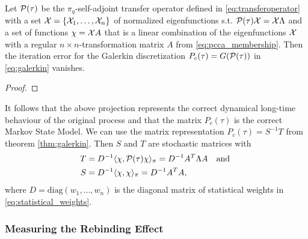 \begin{thm}
Let $\mathcal{P}(\tau)$ be the $\pi_q$-self-adjoint transfer operator defined in \eqref{eq:transferoperator} with a set $\mathcal{X} = \{ \mathcal{X}_1,\dots, \mathcal{X}_n\}$ of normalized eigenfunctions s.t. $\mathcal{P} (\tau) \mathcal{X} = \mathcal{X} \Lambda$ and a set of functions $\chi = \mathcal{X} A$ that is a linear combination of the eigenfunctions $\mathcal{X}$ with a regular $n \times n$-transformation matrix $A$ from \eqref{eq:pcca_membership}.
Then the iteration error for the Galerkin discretization $P_c(\tau) = G(\mathcal{P}(\tau))$ in \eqref{eq:galerkin} vanishes.
\end{thm}
\begin{proof}
\end{proof}
It follows that the above projection represents the correct dynamical long-time behaviour of the original process and that the matrix $P_c(\tau)$ is the correct Markov State Model.
We can use the matrix representation $P_c(\tau)=S^{-1}T$ from theorem \ref{thm:galerkin}. Then $S$ and $T$ are stochastic matrices with 
\begin{equation}
\label{eq:projection_presentation}
\begin{aligned}
T & = D^{-1} \langle \chi, \mathcal{P}(\tau) \chi \rangle_\pi = D^{-1}A^T \Lambda A \ \ \textrm{ and } \\
S & = D^{-1} \langle \chi, \chi \rangle_\pi = D^{-1} A^T A,
\end{aligned}
\end{equation}
where $D= \mathrm{diag}(w_1,\dots,w_n)$ is the diagonal matrix of statistical weights in \eqref{eq:statistical_weights}.

\subsubsection*{Measuring the Rebinding Effect} 

